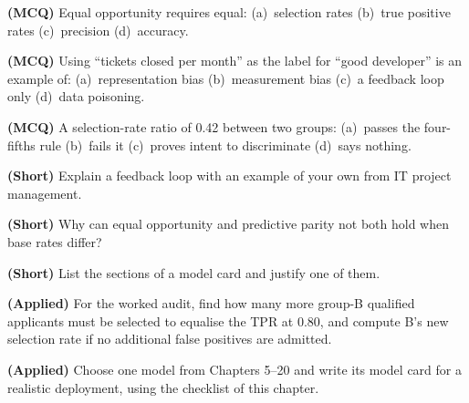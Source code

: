 \begin{reviewq}
  \item \textbf{(MCQ)} Equal opportunity requires equal: (a)~selection rates
        (b)~true positive rates (c)~precision (d)~accuracy.
  \item \textbf{(MCQ)} Using ``tickets closed per month'' as the label for ``good
        developer'' is an example of: (a)~representation bias (b)~measurement bias
        (c)~a feedback loop only (d)~data poisoning.
  \item \textbf{(MCQ)} A selection-rate ratio of 0.42 between two groups: (a)~passes the
        four-fifths rule (b)~fails it (c)~proves intent to discriminate (d)~says nothing.
  \item \textbf{(Short)} Explain a feedback loop with an example of your own from IT
        project management.
  \item \textbf{(Short)} Why can equal opportunity and predictive parity not both hold
        when base rates differ?
  \item \textbf{(Short)} List the sections of a model card and justify one of them.
  \item \textbf{(Applied)} For the worked audit, find how many more group-B qualified
        applicants must be selected to equalise the TPR at 0.80, and compute B's new
        selection rate if no additional false positives are admitted.
  \item \textbf{(Applied)} Choose one model from Chapters 5--20 and write its model
        card for a realistic deployment, using the checklist of this chapter.
\end{reviewq}
